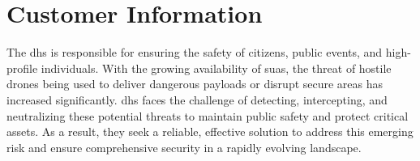\chapter{Customer Information}\label{cp:customer}

The \acrfull{dhs} is responsible for ensuring the safety of citizens, public events, and high-profile individuals. With the growing availability of \acrfull{suas}, the threat of hostile drones being used to deliver dangerous payloads or disrupt secure areas has increased significantly. \acrshort{dhs} faces the challenge of detecting, intercepting, and neutralizing these potential threats to maintain public safety and protect critical assets. As a result, they seek a reliable, effective solution to address this emerging risk and ensure comprehensive security in a rapidly evolving landscape.